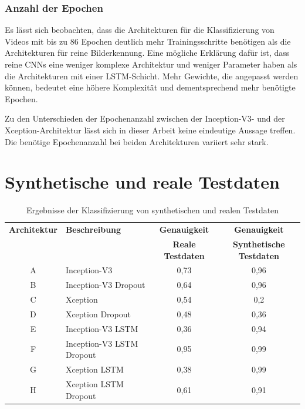 \subsubsection{Anzahl der Epochen}

Es lässt sich beobachten, dass die Architekturen für die Klassifizierung von Videos mit bis zu 86 Epochen deutlich mehr Trainingsschritte benötigen als die Architekturen für reine Bilderkennung. Eine mögliche Erklärung dafür ist, dass reine \acp{CNN} eine weniger komplexe Architektur und weniger Parameter haben als die Architekturen mit einer \ac{LSTM}-Schicht. Mehr Gewichte, die angepasst werden können, bedeutet eine höhere Komplexität und dementsprechend mehr benötigte Epochen.

Zu den Unterschieden der Epochenanzahl zwischen der Inception-V3- und der Xception-Architektur lässt sich in dieser Arbeit keine eindeutige Aussage treffen. Die benötige Epochenanzahl bei beiden Architekturen variiert sehr stark.

\section{Synthetische und reale Testdaten}
\label{ergebnis_synth_vs_real}

\begin{table}[h]
\small
\centering
\def\arraystretch{1.4}
\begin{tabular}{c p{3cm} c c}
\textbf{Architektur} & \textbf{Beschreibung} & \textbf{Genauigkeit} & \textbf{Genauigkeit} \\
 & & \textbf{Reale Testdaten} & \textbf{Synthetische Testdaten} \\
\hline
A & Inception-V3 & 0,73 & 0,96 \\
\hline
B & Inception-V3 \newline Dropout & 0,64 & 0,96 \\
\hline
C & Xception & 0,54 & 0,2 \\
\hline
D & Xception \newline Dropout & 0,48 & 0,36 \\
\hline 
E & Inception-V3 \newline LSTM & 0,36 & 0,94 \\
\hline
F & Inception-V3 \newline LSTM \newline Dropout & 0,95 & 0,99 \\
\hline
G & Xception \newline LSTM & 0,38 & 0,99 \\
\hline
H & Xception \newline LSTM \newline Dropout & 0,61 & 0,91 \\
\hline
\end{tabular}
\caption{Ergebnisse der Klassifizierung von synthetischen und realen Testdaten}
\label{tab_ergebnis_synth}
\end{table}

